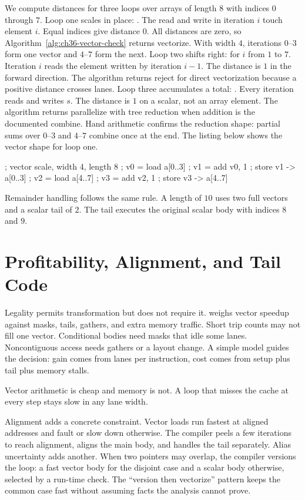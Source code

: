 We compute distances for three loops over arrays of length $8$ with indices $0$ through $7$.
Loop one scales in place: .
The read and write in iteration $i$ touch element $i$.
Equal indices give distance $0$.
All distances are zero, so Algorithm~\ref{alg:ch36-vector-check} returns vectorize.
With width $4$, iterations $0$--$3$ form one vector and $4$--$7$ form the next.
Loop two shifts right:  for $i$ from $1$ to $7$.
Iteration $i$ reads the element written by iteration $i - 1$.
The distance is $1$ in the forward direction.
The algorithm returns reject for direct vectorization because a positive distance crosses lanes.
Loop three accumulates a total: .
Every iteration reads and writes $s$.
The distance is $1$ on a scalar, not an array element.
The algorithm returns parallelize with tree reduction when addition is the documented combine.
Hand arithmetic confirms the reduction shape: partial sums over $0$--$3$ and $4$--$7$ combine once at the end.
The listing below shows the vector shape for loop one.
\begin{irlisting}
; vector scale, width 4, length 8
; v0 = load a[0..3]
; v1 = add v0, 1
; store v1 -> a[0..3]
; v2 = load a[4..7]
; v3 = add v2, 1
; store v3 -> a[4..7]
\end{irlisting}
Remainder handling follows the same rule.
A length of $10$ uses two full vectors and a scalar tail of $2$.
The tail executes the original scalar body with indices $8$ and $9$.

\section{Profitability, Alignment, and Tail Code}\label{sec:ch36-profit}

Legality permits transformation but does not require it.
 weighs vector speedup against masks, tails, gathers, and extra memory traffic.
Short trip counts may not fill one vector.
Conditional bodies need masks that idle some lanes.
Noncontiguous access needs gathers or a layout change.
A simple model guides the decision: gain comes from lanes per instruction, cost comes from setup plus tail plus memory stalls.
\begin{ccnote}
Vector arithmetic is cheap and memory is not.
A loop that misses the cache at every step stays slow in any lane width.
\end{ccnote}
Alignment adds a concrete constraint.
Vector loads run fastest at aligned addresses and fault or slow down otherwise.
The compiler peels a few iterations to reach alignment, aligns the main body, and handles the tail separately.
Alias uncertainty adds another.
When two pointers may overlap, the compiler versions the loop: a fast vector body for the disjoint case and a scalar body otherwise, selected by a run-time check.
The \enquote{version then vectorize} pattern keeps the common case fast without assuming facts the analysis cannot prove.

